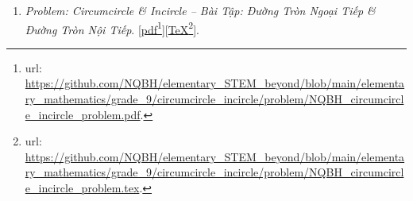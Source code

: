 \documentclass[12pt,twoside]{book}
\begin{document}
\begin{enumerate}
	Folder: {\sf Elementary STEM \& Beyond{\tt/}Elementary Mathematics{\tt/}grade 9{\tt/}2nd-order function, quadratic equation{\tt/}problem}.
	\begin{itemize}
		\item {\it Problem \& Solution: 2nd-Order Function. Quadratic Equation -- Bài Tập \& Lời Giải: Hàm Số Bậc 2 $y = ax^2$. Phương Trình Bậc 2 1 Ẩn $ax^2 + bx + c = 0$}. [\href{https://github.com/NQBH/elementary_STEM_beyond/blob/main/elementary_mathematics/grade_9/2nd_order_function/solution/NQBH_2nd_order_function_solution.pdf}{pdf}\footnote{{\sc url}: \url{https://github.com/NQBH/elementary_STEM_beyond/blob/main/elementary_mathematics/grade_9/2nd_order_function/solution/NQBH_2nd_order_function_solution.pdf}.}][\href{https://github.com/NQBH/elementary_STEM_beyond/blob/main/elementary_mathematics/grade_9/2nd_order_function/solution/NQBH_2nd_order_function_solution.tex}{\TeX}\footnote{{\sc url}: \url{https://github.com/NQBH/elementary_STEM_beyond/blob/main/elementary_mathematics/grade_9/2nd_order_function/solution/NQBH_2nd_order_function_solution.tex}.}].
		
		Folder: {\sf Elementary STEM \& Beyond{\tt/}Elementary Mathematics{\tt/}grade 9{\tt/}2nd-order function, quadratic equation{\tt/}solution}.
	\end{itemize}
	\item {\it Problem: Circumcircle {\it\&} Incircle -- Bài Tập: Đường Tròn Ngoại Tiếp {\it\&} Đường Tròn Nội Tiếp}. [\href{https://github.com/NQBH/elementary_STEM_beyond/blob/main/elementary_mathematics/grade_9/circumcircle_incircle/problem/NQBH_circumcircle_incircle_problem.pdf}{pdf}\footnote{{\sc url}: \url{https://github.com/NQBH/elementary_STEM_beyond/blob/main/elementary_mathematics/grade_9/circumcircle_incircle/problem/NQBH_circumcircle_incircle_problem.pdf}.}][\href{https://github.com/NQBH/elementary_STEM_beyond/blob/main/elementary_mathematics/grade_9/circumcircle_incircle/problem/NQBH_circumcircle_incircle_problem.tex}{\TeX}\footnote{{\sc url}: \url{https://github.com/NQBH/elementary_STEM_beyond/blob/main/elementary_mathematics/grade_9/circumcircle_incircle/problem/NQBH_circumcircle_incircle_problem.tex}.}].
	

\end{enumerate}
\end{document}
